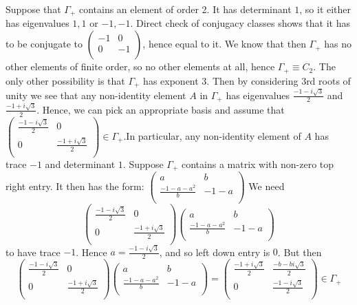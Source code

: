 \documentclass[a4paper]{article}
\begin{document}
    Suppose that $\Gamma_+$ contains an element of order 2. It has determinant $1$, so it either has eigenvalues $1, 1$ or $-1, -1$. Direct check of conjugacy classes shows that it has to be conjugate to $\begin{pmatrix}
    -1 & 0 \\ 
    0 & -1 \\
    \end{pmatrix}$, hence equal to it. We know that then $\Gamma_+$ has no other elements of finite order, so no other elements at all, hence $\Gamma_+ \equiv C_2$.
    The only other possibility is that $\Gamma_+$ has exponent 3. Then by considering 3rd roots of unity we see that any non-identity element $A$ in $\Gamma_+$ has eigenvalues $\frac{-1-i\sqrt{3}}{2}$ and $\frac{-1+i\sqrt{3}}{2}$. Hence, we can pick an appropriate basis and assume that $\begin{pmatrix}
    \frac{-1-i\sqrt{3}}{2} & 0 \\ 
    0 &  \frac{-1+i\sqrt{3}}{2}\\
    \end{pmatrix} \in \Gamma_+$.In particular, any non-identity element of $A$ has trace $-1$ and determinant $1$. Suppose $\Gamma_+$ contains a matrix with non-zero top right entry. It then has the form:
    $\begin{pmatrix}
    a & b \\ 
    \frac{-1-a-a^2}{b} & -1-a \\
    \end{pmatrix}$ 
    We need 
    $$\begin{pmatrix}
    \frac{-1-i\sqrt{3}}{2} & 0 \\ 
    0 &  \frac{-1+i\sqrt{3}}{2}\\
    \end{pmatrix} \begin{pmatrix}
    a & b \\ 
    \frac{-1-a-a^2}{b} & -1-a \\
    \end{pmatrix}$$ to have trace $-1$. Hence $a = \frac{-1-i\sqrt{3}}{2}$, and so left down entry is $0$. 
    But then 
    $$\begin{pmatrix}
    \frac{-1-i\sqrt{3}}{2} & 0 \\ 
    0 &  \frac{-1+i\sqrt{3}}{2}\\
    \end{pmatrix} \begin{pmatrix}
    a & b \\ 
    \frac{-1-a-a^2}{b} & -1-a \\
    \end{pmatrix} = \begin{pmatrix}
    \frac{-1+i\sqrt{3}}{2} & \frac{-b-b i\sqrt{3}}{2} \\ 
    0 & \frac{-1-i\sqrt{3}}{2} \\
    \end{pmatrix} \in \Gamma_+$$
\end{document}
